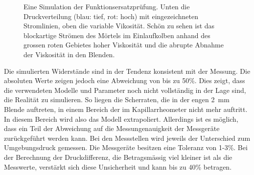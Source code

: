 \begin{figure}[htb]
    \centering
    \caption{Eine Simulation der Funktionsersatzprüfung. Unten die Druckverteilung (blau: tief, rot: hoch) mit eingezeichneten Stromlinien, oben die variable Vikosität. Schön zu sehen ist das blockartige Strömen des Mörtels im Einlaufkolben anhand des grossen roten Gebietes hoher Viskosität und die abrupte Abnahme der Viskosität in den Blenden.}
    \label{fig:fepSimResult}
\end{figure}

Die simulierten Widerstände sind in der Tendenz konsistent mit der Messung. Die absoluten Werte zeigen jedoch eine Abweichung von bis zu 50\%. Dies zeigt, dass die verwendeten Modelle und Parameter noch nicht vollständig in der Lage sind, die Realität zu simulieren. So liegen die Scherraten, die in der engen \SI{2}{mm} Blende auftreten, in einem Bereich der im Kapillarrheometer nicht mehr auftritt. In diesem Bereich wird also das Modell extrapoliert.
Allerdings ist es möglich, dass ein Teil der Abweichung auf die Messungenauigkeit der Messgeräte zurückgeführt werden kann. 
Bei den Messstellen wird jeweils der Unterschied zum Umgebungsdruck gemessen. Die Messgeräte besitzen eine Toleranz von 1-3\%. 
Bei der Berechnung der Druckdifferenz, die Betragsmässig viel kleiner ist als die Messwerte, verstärkt sich diese Unsicherheit und kann bis zu 40\% betragen.
%
